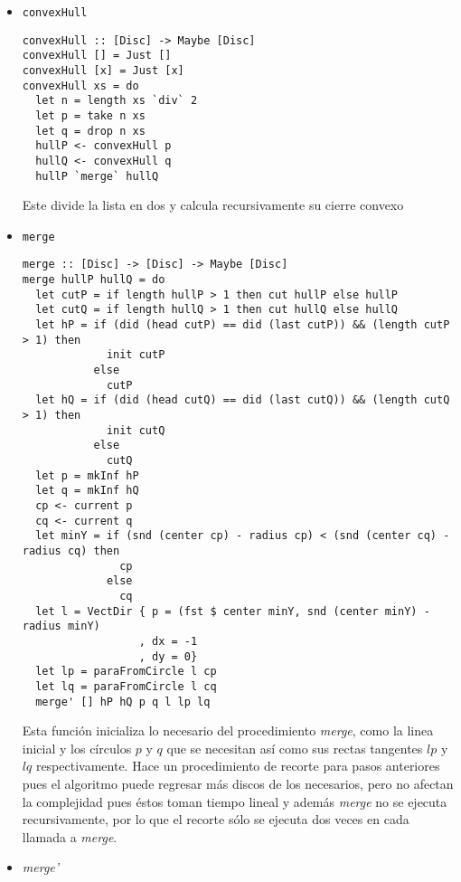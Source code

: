 \documentclass[12pt]{article}
\begin{document}
\begin{itemize}
\item \texttt{convexHull}

  \begin{verbatim}
convexHull :: [Disc] -> Maybe [Disc]
convexHull [] = Just []
convexHull [x] = Just [x]
convexHull xs = do
  let n = length xs `div` 2
  let p = take n xs
  let q = drop n xs
  hullP <- convexHull p
  hullQ <- convexHull q
  hullP `merge` hullQ
  \end{verbatim}

  Este divide la lista en dos y calcula recursivamente su cierre convexo

\item \texttt{merge}

  \begin{verbatim}
merge :: [Disc] -> [Disc] -> Maybe [Disc]
merge hullP hullQ = do
  let cutP = if length hullP > 1 then cut hullP else hullP
  let cutQ = if length hullQ > 1 then cut hullQ else hullQ
  let hP = if (did (head cutP) == did (last cutP)) && (length cutP > 1) then
             init cutP
           else
             cutP
  let hQ = if (did (head cutQ) == did (last cutQ)) && (length cutQ > 1) then
             init cutQ
           else
             cutQ
  let p = mkInf hP
  let q = mkInf hQ
  cp <- current p
  cq <- current q
  let minY = if (snd (center cp) - radius cp) < (snd (center cq) - radius cq) then
               cp
             else
               cq
  let l = VectDir { p = (fst $ center minY, snd (center minY) - radius minY)
                  , dx = -1
                  , dy = 0}
  let lp = paraFromCircle l cp
  let lq = paraFromCircle l cq
  merge' [] hP hQ p q l lp lq
  \end{verbatim}

  Esta función inicializa lo necesario del procedimiento \textit{merge}, como la linea inicial y los círculos $p$ y $q$ que se necesitan así como sus rectas tangentes $lp$ y $lq$ respectivamente. Hace un procedimiento de recorte para pasos anteriores pues el algoritmo puede regresar más discos de los necesarios, pero no afectan la complejidad pues éstos toman tiempo lineal y además \textit{merge} no se ejecuta recursivamente, por lo que el recorte sólo se ejecuta dos veces en cada llamada a \textit{merge}.

\item \textit{merge'}


\end{itemize}
\end{document}
